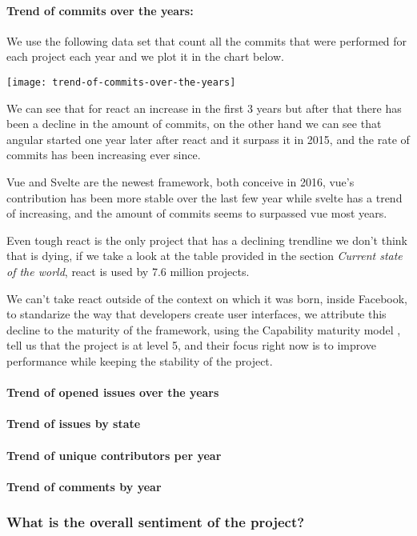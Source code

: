 \paragraph{Trend of commits over the years:} We use the following data set \cite{trend-of-commits-over-the-years} that count all the commits that were performed for each project each year and we plot it in the chart below.
\begin{center}
    \texttt{[image: trend-of-commits-over-the-years]}    
\end{center}

We can see that for react an increase in the first 3 years but after that there has been a decline in the amount of commits, on the other hand we can see that angular started one year later after react and it surpass it in 2015, and the rate of commits has been increasing ever since.

Vue and Svelte are the newest framework, both conceive in 2016, vue's contribution has been more stable over the last few year while svelte has a trend of increasing, and the amount of commits seems to surpassed vue most years.

Even tough react is the only project that has a declining trendline we don't think that is dying, if we take a look at the table provided in the section \textit{Current state of the world}, react is used by 7.6 million projects.

We can't take react outside of the context on which it was born, inside Facebook, to standarize the way that developers create user interfaces, we attribute this decline to the maturity of the framework, using the Capability maturity model \cite{cmm}, tell us that the project is at level 5, and their focus right now is to improve performance while keeping the stability of the project.

\paragraph{Trend of opened issues over the years}
\paragraph{Trend of issues by state}
\paragraph{Trend of unique contributors per year}
\paragraph{Trend of comments by year}


\subsubsection{What is the overall sentiment of the project?}
